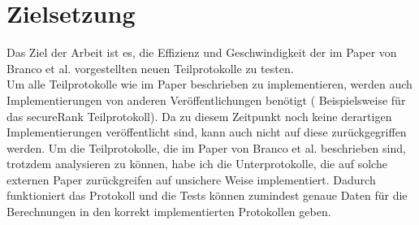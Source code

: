 \section{Zielsetzung}
Das Ziel der Arbeit ist es, die Effizienz und Geschwindigkeit der im Paper von Branco et al. \cite{Doettling2021} vorgestellten neuen Teilprotokolle zu testen. \\
Um alle Teilprotokolle wie im Paper beschrieben zu implementieren, werden auch Implementierungen von anderen Veröffentlichungen benötigt (\cite{Schoenmakers} Beispielsweise für das secureRank Teilprotokoll). Da zu diesem Zeitpunkt noch keine derartigen Implementierungen veröffentlicht sind, kann auch nicht auf diese zurückgegriffen werden. Um die Teilprotokolle, die im Paper von Branco et al. \cite{Doettling2021} beschrieben sind, trotzdem analysieren zu können, habe ich die Unterprotokolle, die auf solche externen Paper zurückgreifen auf unsichere Weise implementiert. Dadurch funktioniert das Protokoll und die Tests können zumindest genaue Daten für die Berechnungen in den korrekt implementierten Protokollen geben.
